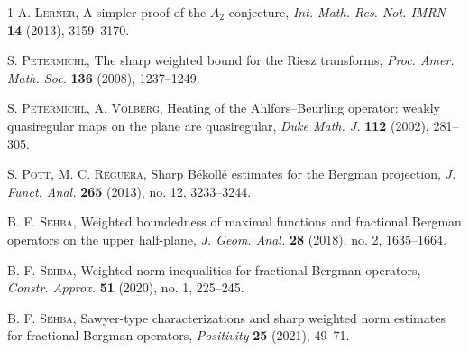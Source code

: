\documentclass[a4paper,11pt,intlimits,oneside]{amsart}
\theoremstyle{definition}
\numberwithin{equation}{section}
\theoremstyle{definition}
\begin{document}
\begin{thebibliography}{1}
\textsc{A. Lerner}, A simpler proof of the $A_2$ conjecture, \emph{Int. Math. Res. Not. IMRN} \textbf{14} (2013), 3159--3170.

\textsc{S. Petermichl}, The sharp weighted bound for the Riesz transforms, \emph{Proc. Amer. Math. Soc.} \textbf{136} (2008), 1237--1249.

\textsc{S. Petermichl, A. Volberg}, Heating of the Ahlfors--Beurling operator: weakly quasiregular maps on the plane are quasiregular, \emph{Duke Math. J.} \textbf{112} (2002), 281--305.

\textsc{S. Pott, M. C. Reguera}, Sharp B\'ekoll\'e estimates for the Bergman projection, \emph{J. Funct. Anal.} \textbf{265} (2013), no. 12, 3233--3244.

\textsc{B. F. Sehba}, Weighted boundedness of maximal functions and fractional Bergman operators on the upper half-plane, \emph{J. Geom. Anal.} \textbf{28} (2018), no. 2, 1635--1664.

\textsc{B. F. Sehba}, Weighted norm inequalities for fractional Bergman operators, \emph{Constr. Approx.} \textbf{51} (2020), no. 1, 225--245.

\textsc{B. F. Sehba}, Sawyer-type characterizations and sharp weighted norm estimates for fractional Bergman operators, \emph{Positivity} \textbf{25} (2021), 49--71.

\end{thebibliography}
\end{document}
